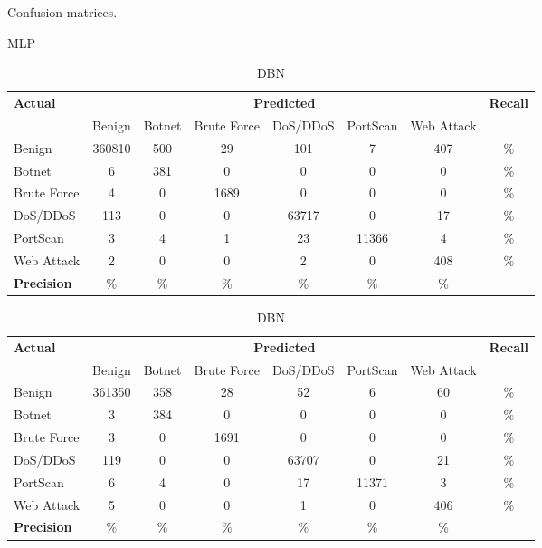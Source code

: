 \documentclass[runningheads]{llncs}
\begin{document}
\begin{table}[ht]
    \caption{Confusion matrices.}
    \label{tab:confusion_matrix_eval}
    \begin{subtable}[ht]{\textwidth}
        \centering
        \caption{MLP}
        \label{subtab:mlp_confusion_matrix}
        \begin{tabular}[t]{lccccccc}
        \toprule
        \bf Actual & \multicolumn{6}{c}{\bf Predicted} & \bf Recall\\ 
        \cmidrule{2-7} &
        Benign & Botnet & Brute Force & DoS/DDoS & PortScan & Web Attack & \\\midrule
        Benign      & 360810  & 500  & 29   & 101    & 7      & 407  & \%\\
        Botnet & 6       & 381  & 0    & 0      & 0      & 0    & \% \\
        Brute Force & 4       & 0    & 1689 & 0      & 0      & 0    & \%\\
        DoS/DDoS    & 113     & 0    & 0    & 63717  & 0      & 17   & \%\\
        PortScan    & 3       & 4    & 1    & 23     & 11366  & 4    & \%\\
        Web Attack  & 2       & 0    & 0    & 2      & 0      & 408  & \%\\\midrule
        \bf Precision & \% & \% & \% & \%  & \%  & \% & \\
        \bottomrule
        \end{tabular}
    \end{subtable}
    \hfill
    \begin{subtable}[ht]{\textwidth}
        \centering
        \caption{DBN}
        \label{subtab:dbn_confusion_matrix}
        \begin{tabular}[t]{lccccccc}
        \toprule
        \bf Actual & \multicolumn{6}{c}{\bf Predicted} & \bf Recall\\ 
        \cmidrule{2-7} &
        Benign & Botnet & Brute Force & DoS/DDoS & PortScan & Web Attack & \\\midrule
        Benign      & 361350  & 358  & 28   & 52     & 6      & 60   & \%\\
        Botnet & 3       & 384  & 0    & 0      & 0      & 0    & \% \\
        Brute Force & 3       & 0    & 1691 & 0      & 0      & 0    & \%\\
        DoS/DDoS    & 119     & 0    & 0    & 63707  & 0      & 21   & \%\\
        PortScan    & 6       & 4    & 0    & 17     & 11371  & 3    & \%\\
        Web Attack  & 5       & 0    & 0    & 1      & 0      & 406  & \% \\\midrule
        \bf Precision   & \%   & \% & \% & \%  & \%  & \% & \\
        \bottomrule
        \end{tabular}
    \end{subtable}
\end{table}
\end{document}
